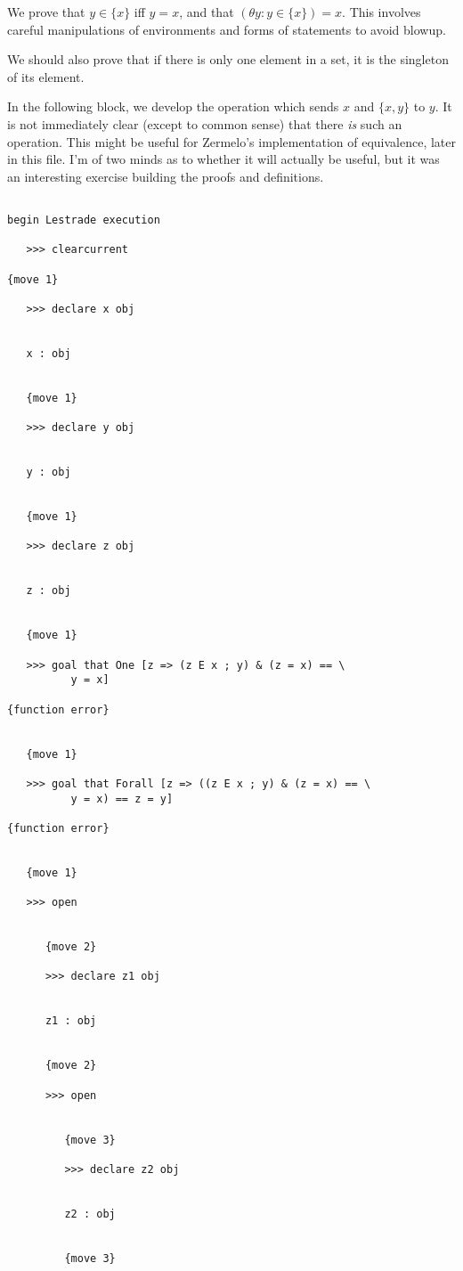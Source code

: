 \documentclass[12pt]{article}
\begin{document}
We prove that $y \in \{x\}$ iff $y=x$, and that $(\theta y: y \in \{x\})=x$.  This involves careful manipulations of environments and forms of statements to avoid blowup.

We should also prove that if there is only one element in a set, it is the singleton of its element.

In the following block, we develop the operation which sends $x$ and $\{x,y\}$ to $y$.  It is not immediately clear (except to common sense) that there
{\em is\/} such an operation.  This might be useful for Zermelo's implementation of equivalence, later in this file.  I'm of two minds as to whether it will actually be useful, but it was an interesting exercise building the proofs and definitions.

\begin{verbatim}

begin Lestrade execution

   >>> clearcurrent

{move 1}

   >>> declare x obj


   x : obj


   {move 1}

   >>> declare y obj


   y : obj


   {move 1}

   >>> declare z obj


   z : obj


   {move 1}

   >>> goal that One [z => (z E x ; y) & (z = x) == \
          y = x]

{function error}


   {move 1}

   >>> goal that Forall [z => ((z E x ; y) & (z = x) == \
          y = x) == z = y]

{function error}


   {move 1}

   >>> open


      {move 2}

      >>> declare z1 obj


      z1 : obj


      {move 2}

      >>> open


         {move 3}

         >>> declare z2 obj


         z2 : obj


         {move 3}


\end{verbatim}
\end{document}
